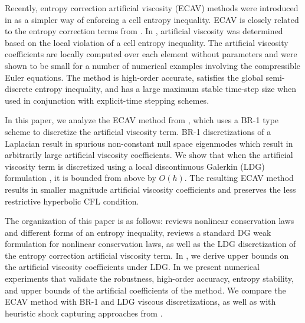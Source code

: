 \documentclass{elsarticle}
\theoremstyle{definition}
\theoremstyle{plain}
\theoremstyle{plain}
\begin{document}
Recently, entropy correction artificial viscosity (ECAV) methods were introduced in \cite{chan2025artificial,  christner2025entropystablefinitedifference, christner2025entropystablenodaldiscontinuous} as a simpler way of enforcing a cell entropy inequality. ECAV is closely related to the entropy correction terms from \cite{abgrall2018general, abgrall2022reinterpretation, edoh2024conservative, gaburro2023high, mantri2024fully}. In \cite{chan2025artificial}, artificial viscosity was determined based on the local violation of a cell entropy inequality. The artificial viscosity coefficients are locally computed over each element without parameters and were shown to be small for a number of numerical examples involving the compressible Euler equations. The method is high-order accurate, satisfies the global semi-discrete entropy inequality, and has a large maximum stable time-step size when used in conjunction with explicit-time stepping schemes. 



In this paper, we analyze the ECAV method from \cite{chan2025artificial}, which uses a BR-1 type scheme to discretize the artificial viscosity term. BR-1 discretizations of a Laplacian result in spurious non-constant null space eigenmodes \cite{hesthaven2007nodal, sherwin20062d} which result in arbitrarily large artificial viscosity coefficients. We show that when the artificial viscosity term is discretized using a local discontinuous Galerkin (LDG) formulation \cite{cockburn2007analysis, cockburn1998local}, it is bounded from above by $O(h)$. The resulting ECAV method results in smaller magnitude artificial viscosity coefficients and preserves the less restrictive hyperbolic CFL condition.

The organization of this paper is as follows:  reviews nonlinear conservation laws and different forms of an entropy inequality,  reviews a standard DG weak formulation for nonlinear conservation laws, as well as the LDG discretization of the entropy correction artificial viscosity term. In , we derive upper bounds on the artificial viscosity coefficients under LDG. In  we present numerical experiments that validate the robustness, high-order accuracy, entropy stability, and upper bounds of the artificial coefficients of the method. We compare the ECAV method with BR-1 \cite{chan2025artificial} and LDG viscous discretizations, as well as with heuristic shock capturing approaches from \cite{hennemann2021provably, persson2006sub, PGSH2020}. 
\end{document}
